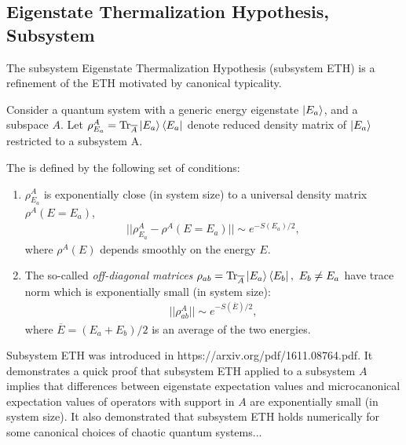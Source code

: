 \subsection{Eigenstate Thermalization Hypothesis, Subsystem}
The subsystem Eigenstate Thermalization Hypothesis (subsystem ETH) is a refinement of the ETH motivated by canonical typicality.

\begin{definition}
    Consider a quantum system with a generic energy eigenstate \(\ket{E_a}\), and a subspace \(A\).
    Let \(\rho^A_{E_a} = \Tr_{\overline{A}} \ket{E_a}\bra{E_a}\) denote reduced density matrix of \(\ket{E_a}\) restricted to a subsystem A.
    
    The  is defined by the following set of conditions:
    \begin{enumerate}
        \item
        \(\rho^A_{E_a}\) is exponentially close (in system size) to a universal density matrix \(\rho^A(E=E_a)\),
        \begin{align}
            ||\rho^A_{E_a} - \rho^A(E=E_a)|| \sim e^{-S(E_a)/2}
            ,
        \end{align}
        where \(\rho^A(E)\) depends smoothly on the energy \(E\).

        \item
        The so-called \textit{off-diagonal matrices} \(\rho_{ab} = \Tr_{\overline{A}}\ket{E_a}\bra{E_b},~E_b\neq E_a\) have trace norm which is exponentially small (in system size):
        \begin{align}
            || \rho^A_{ab} || \sim e^{-S(\overline{E})/2}
            ,
        \end{align}
        where \(\overline{E} = (E_a + E_b)/2\) is an average of the two energies.
    \end{enumerate}

\end{definition}

Subsystem ETH was introduced in \cite{} https://arxiv.org/pdf/1611.08764.pdf.
%
It demonstrates a quick proof that subsystem ETH applied to a subsystem \(A\) implies that differences between eigenstate expectation values and microcanonical expectation values of operators with support in \(A\) are exponentially small (in system size).
%
It also demonstrated that subsystem ETH holds numerically for some canonical choices of chaotic quantum systems...



